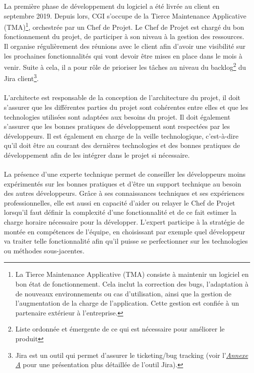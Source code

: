 \documentclass[12pt, a4paper]{report}
\begin{document}
	La première phase de développement du logiciel a été livrée au client en septembre 2019. Depuis lors, CGI s'occupe de la Tierce Maintenance Applicative (TMA)\footnote{La Tierce Maintenance Applicative (TMA) consiste à maintenir un logiciel en bon état de fonctionnement. Cela inclut la correction des bugs, l'adaptation à de nouveaux environnements ou cas d'utilisation, ainsi que la gestion de l'augmentation de la charge de l'application. Cette gestion est confiée à un partenaire extérieur à l'entreprise.}, orchestrée par un Chef de Projet. Le Chef de Projet est chargé du bon fonctionnement du projet, de participer à son niveau à la gestion des ressources. Il organise régulièrement des réunions avec le client afin d'avoir une visibilité sur les prochaines fonctionnalités qui vont devoir être mises en place dans le mois à venir. Suite à cela, il a pour rôle de prioriser les tâches au niveau du backlog\footnote{Liste ordonnée et émergente de ce qui est nécessaire pour améliorer le produit} du Jira client\footnote{Jira est un outil qui permet d'assurer le ticketing/bug tracking (voir l'\hyperref[sec:outils]{\it{Annexe A}} pour une présentation plus détaillée de l'outil Jira).}.
	\\\\
	L'architecte est responsable de la conception de l'architecture du projet, il doit s'assurer que les différentes parties du projet sont cohérentes entre elles et que les technologies utilisées sont adaptées aux besoins du projet. Il doit également s'assurer que les bonnes pratiques de développement sont respectées par les développeurs. Il est également en charge de la veille technologique, c'est-à-dire qu'il doit être au courant des dernières technologies et des bonnes pratiques de développement afin de les intégrer dans le projet si nécessaire.
	\\\\
	La présence d'une experte technique permet de conseiller les développeurs moins expérimentés sur les bonnes pratiques et d'être un support technique au besoin des autres développeurs. Grâce à ses connaissances techniques et ses expériences professionnelles, elle est aussi en capacité d'aider ou relayer le Chef de Projet lorsqu'il faut définir la complexité d'une fonctionnalité et de ce fait estimer la charge horaire nécessaire pour la développer. L'expert participe à la stratégie de montée en compétences de l'équipe, en choisissant par exemple quel développeur va traiter telle fonctionnalité afin qu'il puisse se perfectionner sur les technologies ou méthodes sous-jacentes.
\end{document}

